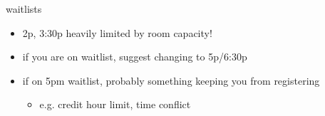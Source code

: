 \begin{frame}{waitlists}
    \begin{itemize}
    \item 2p, 3:30p heavily limited by room capacity!
    \item if you are on waitlist, suggest changing to 5p/6:30p
    \vspace{.5cm}
    \item if on 5pm waitlist, probably something keeping you from registering
        \begin{itemize}
        \item e.g. credit hour limit, time conflict
        \end{itemize}
    \end{itemize}
\end{frame}
